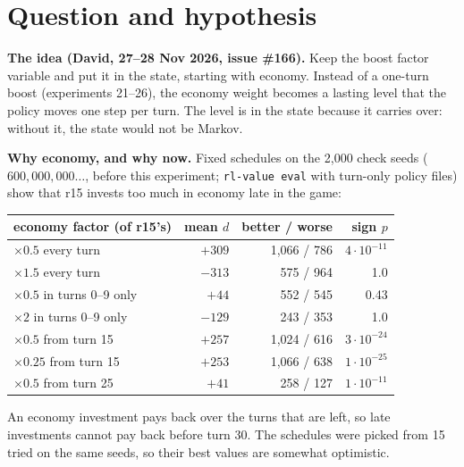 \documentclass{../polyexp}
\begin{document}

\ExpHeader

\section{Question and hypothesis}
\textbf{The idea (David, 27--28 Nov 2026, issue \#166).} Keep the boost factor variable and put it in the state,
starting with economy. Instead of a one-turn boost (experiments 21--26), the economy weight becomes a lasting level
that the policy moves one step per turn. The level is in the state because it carries over: without it, the state
would not be Markov.

\textbf{Why economy, and why now.} Fixed schedules on the 2{,}000 check seeds ($600{,}000{,}000\dots$, before this
experiment; \texttt{rl-value eval} with turn-only policy files) show that r15 invests too much in economy late in the
game:

\begin{center}\small
\begin{tabular}{lrrr}
\toprule
economy factor (of r15's) & mean $d$ & better / worse & sign $p$ \\
\midrule
$\times0.5$ every turn          & $+309$ & 1{,}066 / 786   & $4\cdot10^{-11}$ \\
$\times1.5$ every turn          & $-313$ & 575 / 964       & 1.0 \\
$\times0.5$ in turns 0--9 only  & $+44$  & 552 / 545       & 0.43 \\
$\times2$ in turns 0--9 only    & $-129$ & 243 / 353       & 1.0 \\
$\times0.5$ from turn 15        & $+257$ & 1{,}024 / 616   & $3\cdot10^{-24}$ \\
$\times0.25$ from turn 15       & $+253$ & 1{,}066 / 638   & $1\cdot10^{-25}$ \\
$\times0.5$ from turn 25        & $+41$  & 258 / 127       & $1\cdot10^{-11}$ \\
\bottomrule
\end{tabular}
\end{center}

An economy investment pays back over the turns that are left, so late investments cannot pay back before turn 30. The
schedules were picked from 15 tried on the same seeds, so their best values are somewhat optimistic.
\end{document}

